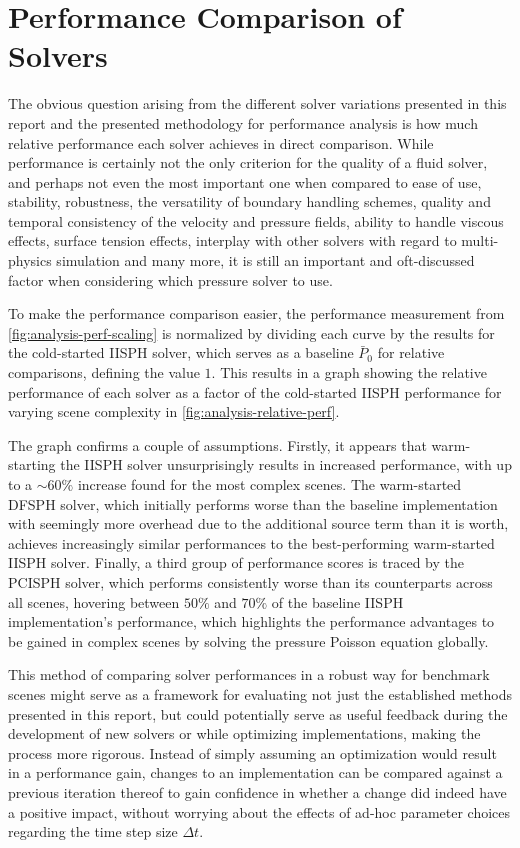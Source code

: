 \documentclass[oneside, a4paper]{book}
\begin{document}
  \section{Performance Comparison of Solvers}
  The obvious question arising from the different solver variations presented in this report and the presented methodology for performance analysis is how much relative performance each solver achieves in direct comparison. While performance is certainly not the only criterion for the quality of a fluid solver, and perhaps not even the most important one when compared to ease of use, stability, robustness, the versatility of boundary handling schemes, quality and temporal consistency of the velocity and pressure fields, ability to handle viscous effects, surface tension effects, interplay with other solvers with regard to multi-physics simulation and many more, it is still an important and oft-discussed factor when considering which pressure solver to use. 

  To make the performance comparison easier, the performance measurement from \autoref{fig:analysis-perf-scaling} is normalized by dividing each curve by the results for the cold-started IISPH solver, which serves as a baseline  $\bar{P}_0$ for relative comparisons, defining the value $1$. This results in a graph showing the relative performance of each solver as a factor of the cold-started IISPH performance for varying scene complexity in \autoref{fig:analysis-relative-perf}. 

  

  The graph confirms a couple of assumptions. Firstly, it appears that warm-starting the IISPH solver unsurprisingly results in increased performance, with up to a $\sim60\%$ increase found for the most complex scenes. The warm-started DFSPH solver, which initially performs worse than the baseline implementation with seemingly more overhead due to the additional source term than it is worth, achieves increasingly similar performances to the best-performing warm-started IISPH solver. Finally, a third group of performance scores is traced by the PCISPH solver, which performs consistently worse than its counterparts across all scenes, hovering between $50\%$ and $70\%$ of the baseline IISPH implementation's performance, which highlights the performance advantages to be gained in complex scenes by solving the pressure Poisson equation globally.

  This method of comparing solver performances in a robust way for benchmark scenes might serve as a framework for evaluating not just the established methods presented in this report, but could potentially serve as useful feedback during the development of new solvers or while optimizing implementations, making the process more rigorous. Instead of simply assuming an optimization would result in a performance gain, changes to an implementation can be compared against a previous iteration thereof to gain confidence in whether a change did indeed have a positive impact, without worrying about the effects of ad-hoc parameter choices regarding the time step size $\Delta t$.
\end{document}
